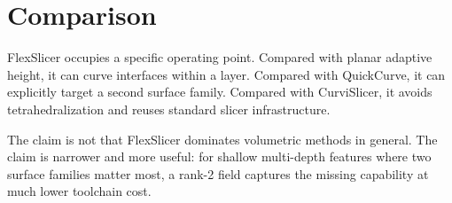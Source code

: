 \section{Comparison}

FlexSlicer occupies a specific operating point. Compared with planar adaptive height, it can curve interfaces within a layer. Compared with QuickCurve, it can explicitly target a second surface family. Compared with CurviSlicer, it avoids tetrahedralization and reuses standard slicer infrastructure.

The claim is not that FlexSlicer dominates volumetric methods in general. The claim is narrower and more useful: for shallow multi-depth features where two surface families matter most, a rank-2 field captures the missing capability at much lower toolchain cost.
